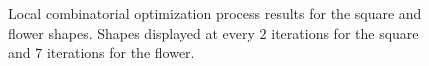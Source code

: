 \documentclass[smallextended]{svjour3}       %
\begin{document}
\begin{figure}[!h]
{	}%
	\hspace{10pt}
	\hspace{10pt}
		\caption{Local combinatorial optimization process results for the square and flower shapes. Shapes displayed at every $2$ iterations for the square and $7$ iterations for the flower.}	
		\label{fig:local-comb-square-results}
\end{figure}
\end{document}
